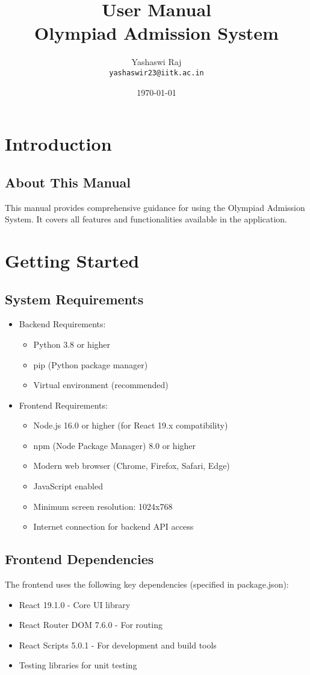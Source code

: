 \documentclass[12pt,a4paper]{article}
\title{User Manual\\
       Olympiad Admission System}
\author{Yashaswi Raj\\\texttt{yashaswir23@iitk.ac.in}}
\date{\today}
\begin{document}
\maketitle
\tableofcontents
\newpage

\section{Introduction}
\subsection{About This Manual}
This manual provides comprehensive guidance for using the Olympiad Admission System. It covers all features and functionalities available in the application.

\section{Getting Started}
\subsection{System Requirements}
\begin{itemize}
    \item Backend Requirements:
    \begin{itemize}
        \item Python 3.8 or higher
        \item pip (Python package manager)
        \item Virtual environment (recommended)
    \end{itemize}
    \item Frontend Requirements:
    \begin{itemize}
        \item Node.js 16.0 or higher (for React 19.x compatibility)
        \item npm (Node Package Manager) 8.0 or higher
        \item Modern web browser (Chrome, Firefox, Safari, Edge)
        \item JavaScript enabled
        \item Minimum screen resolution: 1024x768
        \item Internet connection for backend API access
    \end{itemize}
\end{itemize}

\subsection{Frontend Dependencies}
The frontend uses the following key dependencies (specified in package.json):
\begin{itemize}
    \item React 19.1.0 - Core UI library
    \item React Router DOM 7.6.0 - For routing
    \item React Scripts 5.0.1 - For development and build tools
    \item Testing libraries for unit testing
\end{itemize}
\end{document}
